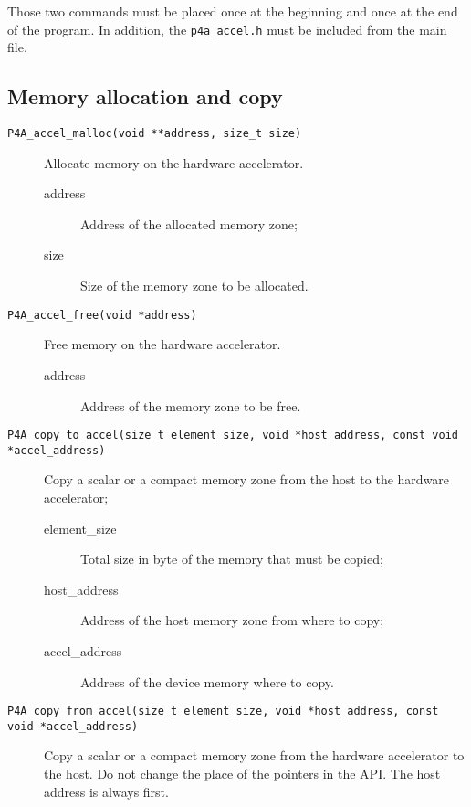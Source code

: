 \documentclass[a4paper]{article}
\begin{document}
Those two commands must be placed once at the beginning and once at
the end of the program. In addition, the \texttt{p4a\_accel.h} must be
included from the main file.

\subsection{Memory allocation and copy}

\begin{description}
\item[\texttt{P4A\_accel\_malloc(void **address, size\_t size)}]
  Allocate memory on the hardware accelerator.

  \begin{description}
  \item[address] Address of the allocated memory zone;
  \item[size] Size of the memory zone to be allocated.
  \end{description}

\item[\texttt{P4A\_accel\_free(void *address)}]
  Free memory on the hardware accelerator.

   \begin{description}
  \item[address] Address of the memory zone to be free.
  \end{description}
 

\item[\texttt{P4A\_copy\_to\_accel(size\_t element\_size, void
    *host\_address, const void *accel\_address)}] Copy a scalar or a
  compact memory zone from the host to the hardware accelerator;

  \begin{description}
  \item[element\_size] Total size in byte of the memory that must be copied;
  \item[host\_address] Address of the host memory zone from where to copy;
  \item[accel\_address] Address of the device memory where to copy.
  \end{description}


\item[\texttt{P4A\_copy\_from\_accel(size\_t element\_size, void
    *host\_address, const void *accel\_address)}] Copy a scalar or a
  compact memory zone from the hardware accelerator to the host.  Do
  not change the place of the pointers in the API. The host address is
  always first.


\end{description}
\end{document}
